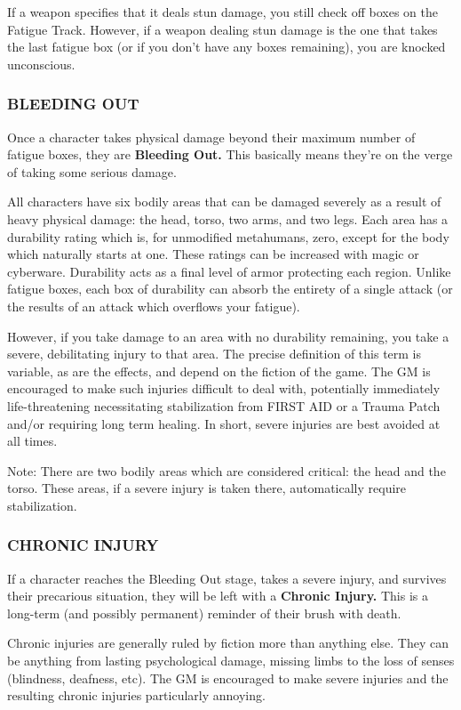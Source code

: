 \documentclass[oneside,10pt]{article}
\begin{document}
\begin{multicols}{2}
If a weapon specifies that it deals stun damage, you still check off
boxes on the Fatigue Track. However, if a weapon dealing stun damage is
the one that takes the last fatigue box (or if you don't have any
boxes remaining), you are knocked unconscious.



\subsubsection{BLEEDING OUT}
Once a character takes physical damage beyond their maximum number of
fatigue boxes, they are \textbf{Bleeding Out.} This basically means
they're on the verge of taking some serious damage.

All characters have six bodily areas that can be damaged severely as a
result of heavy physical damage: the head, torso, two arms, and two
legs. Each area has a durability rating which is, for unmodified
metahumans, zero, except for the body which naturally starts at
one. These ratings can be increased with magic or
cyberware. Durability acts as a final level of armor protecting each
region. Unlike fatigue boxes, each box of durability can absorb the
entirety of a single attack (or the results of an attack which
overflows your fatigue).

However, if you take damage to an area with no durability remaining,
you take a severe, debilitating injury to that area. The precise
definition of this term is variable, as are the effects, and depend on
the fiction of the game. The GM is encouraged to make such injuries
difficult to deal with, potentially immediately life-threatening
necessitating stabilization from FIRST AID or a Trauma Patch and/or
requiring long term healing. In short, severe injuries are best
avoided at all times.

Note: There are two bodily areas which are considered critical: the
head and the torso. These areas, if a severe injury is taken there,
automatically require stabilization.

\subsubsection{CHRONIC INJURY}
If a character reaches the Bleeding Out stage, takes a severe injury,
and survives their precarious situation, they will be left with a
\textbf{Chronic Injury.} This is a long-term (and possibly permanent)
reminder of their brush with death.

Chronic injuries are generally ruled by fiction more than anything
else. They can be anything from lasting psychological damage, missing
limbs to the loss of senses (blindness, deafness, etc). The GM is
encouraged to make severe injuries and the resulting chronic injuries
particularly annoying. 


\end{multicols}
\end{document}
